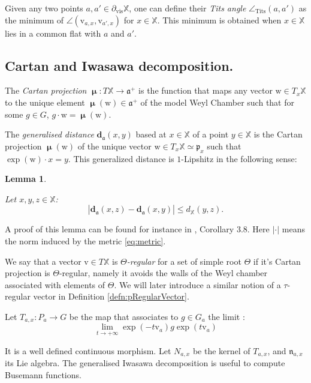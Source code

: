 \documentclass[reqno,10pt]{amsart}
\theoremstyle{plain}
\newtheorem{lem}[thm]{Lemma}
\theoremstyle{definition}
\theoremstyle{remark}
\newcommand{\type}{\tau}
\newcommand{\Tangle}{\angle_\text{Tits}}
\DeclareMathOperator{\vis}{vis}
\newcommand{\partialvis}{\partial_{\vis}}
\newcommand{\da}{\mathbf{d}_{\mathfrak{a}}}
\DeclareMathOperator{\Cartan}{\boldsymbol{\mu}}
\newcommand{\X}{\mathbb{X}}
\newcommand{\ie}{namely }
\begin{document}
Given any two points $a,a'\in \partialvis \X$, one can define their \emph{Tits angle} $\Tangle(a,a')$ as the minimum of $\angle(\mathrm{v}_{a,x},\mathrm{v}_{a',x})$ for $x\in \X$. This minimum is obtained when $x\in \X$ lies in a common flat with $a$ and $a'$.

\subsection{Cartan and Iwasawa decomposition.}
\label{subsec:CartanDec}
The \emph{Cartan projection} $\Cartan:T \X\to \mathfrak{a}^+$ is the function that maps any vector $\mathrm{w}\in T_x\X$ to the unique element $\Cartan(\mathrm{w})\in\mathfrak{a}^+$ of the model Weyl Chamber such that for some $g\in G$, $g\cdot \mathrm{w}=\Cartan(\mathrm{w})$. 

\medskip

The \emph{generalised distance} $\da(x,y)$ based at $x\in \X$ of a point $y\in \X$ is the Cartan projection $\Cartan(\mathrm{w})$ of the unique vector $\mathrm{w}\in T_x\X\simeq\mathfrak{p}_x$ such that $\exp(\mathrm{w})\cdot x=y$. This generalized distance is $1$-Lipshitz in the following sense:

\begin{lem}
\label{lem:GeneralizedDistanceLip}

Let $x,y,z\in\X$:
$$|\da(x,z)-\da(x,y)|\leq d_\X(y,z).$$

\end{lem}

A proof of this lemma can be found for instance in {\cite{Riestenberg}, Corollary 3.8}. Here $|\cdot|$ means the norm induced by the metric \eqref{eq:metric}.

\medskip

We say that a vector $\mathrm{v}\in T\X$ is \emph{$\Theta$-regular} for a set of simple root $\Theta$ if it's Cartan projection is $\Theta$-regular, \ie it avoids the walls of the Weyl chamber associated with elements of $\Theta$. We will later introduce a similar notion of a $\type$-regular vector in Definition \ref{defn:pRegularVector}.

\medskip

Let $T_{a,x}:P_a\to G$ be the map that associates to $g\in G_a$ the limit : $$\lim_{t\to +\infty} \exp(-t\mathrm{v}_a)g\exp(t\mathrm{v}_a)$$
 
  It is a well defined continuous morphism.
 Let $N_{a,x}$ be the kernel of $T_{a,x}$, and $\mathfrak{n}_{a,x}$ its Lie algebra. The generalised Iwasawa decomposition is useful to compute Busemann functions. 
\end{document}
